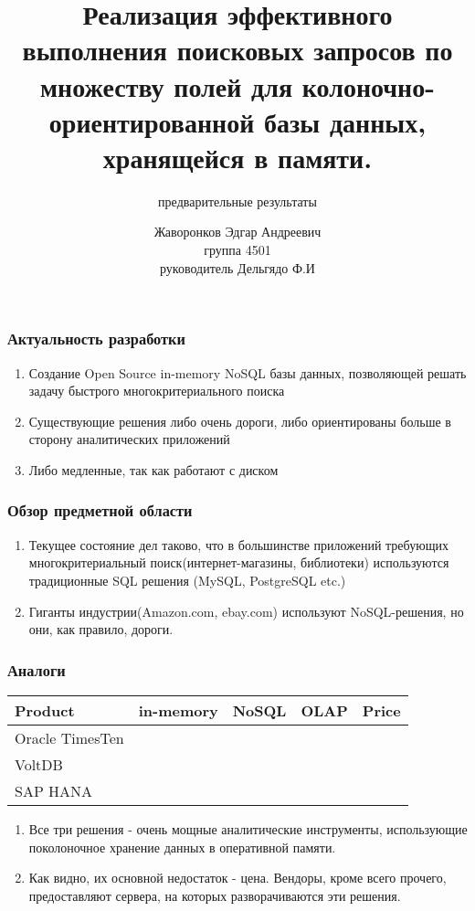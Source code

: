 \documentclass{beamer}
\begin{document}
\title{Реализация эффективного выполнения поисковых запросов по множеству полей для колоночно-ориентированной базы данных, хранящейся в памяти.}
\subtitle{предварительные результаты}
\author{Жаворонков Эдгар Андреевич \\ группа 4501 \\ руководитель Дельгядо Ф.И}

\frame{\titlepage}

\begin{frame}\frametitle{Актуальность разработки}
    \begin{enumerate}
        \item Создание Open Source in-memory NoSQL базы данных, позволяющей решать задачу быстрого многокритериального поиска
        \item Существующие решения либо очень дороги, либо ориентированы больше в сторону аналитических приложений
        \item <2-> Либо медленные, так как работают с диском
    \end{enumerate}
\end{frame}

\begin{frame}\frametitle{Обзор предметной области}
    \begin{enumerate}
        \item Текущее состояние дел таково, что в большинстве приложений требующих многокритериальный поиск(интернет-магазины, библиотеки) используются традиционные SQL решения (MySQL, PostgreSQL etc.) 
        \item Гиганты индустрии(Amazon.com, ebay.com) используют NoSQL-решения, но они, как правило, дороги.
    \end{enumerate}
\end{frame}

\begin{frame}\frametitle{Аналоги}
    \begin{tabular}{| l | c | c | c | c |}
        \hline
        Product & in-memory & NoSQL & OLAP & Price \\
        \hline
        Oracle TimesTen & \color{green}{\checkmark} & \color{green}{\checkmark} & \color{green}{\checkmark} & \color{red}{€19,969.00} \\
        \hline 
        VoltDB          & \color{green}{\checkmark} & \color{green}{\checkmark} & \color{green}{\checkmark} & \color{red}{\$3500/month} \\
        \hline
        SAP HANA        & \color{green}{\checkmark} & \color{green}{\checkmark} & \color{green}{\checkmark} & \color{red}{\$3595/month}\\
        \hline
    \end{tabular}
    \begin{enumerate}
        \item Все три решения - очень мощные аналитические инструменты, использующие поколоночное хранение данных в оперативной памяти. 
        \item Как видно, их основной недостаток - цена. Вендоры, кроме всего прочего, предоставляют сервера, на которых разворачиваются эти решения. 
    \end{enumerate}
\end{frame}
\end{document}
